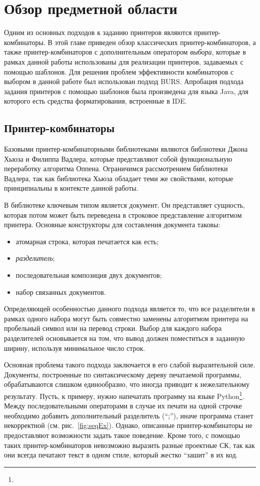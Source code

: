 \section{Обзор предметной области}

Одним из основных подходов к заданию принтеров являются принтер-комбинаторы.
В этой главе приведен обзор классических принтер-комбинаторов, а также
принтер-комбинаторов с дополнительным оператором \emph{выбора}, которые
в рамках данной работы использованы для реализации принтеров, задаваемых
с помощью шаблонов. Для решения проблем эффективности
комбинаторов с выбором в данной работе был использован подход BURS.
Апробация подхода задания принтеров с помощью шаблонов
была произведена для языка Java, для которого есть средства форматирования,
встроенные в IDE.

\subsection{Принтер-комбинаторы}

Базовыми принтер-комбинаторными библиотеками являются библиотеки
Джона Хьюза\cite{hughes} и Филиппа Вадлера\cite{wadler}, которые
представляют собой функциональную переработку алгоритма
Оппена\cite{oppen}.
Ограничимся рассмотрением библиотеки Вадлера, так как
библиотека Хьюза обладает теми же свойствами, которые принципиальны в контексте
данной работы.

В библиотеке ключевым типом является документ.
Он представляет сущность, которая потом может
быть переведена в строковое представление алгоритмом принтера.
Основные конструкторы для составления документа таковы:
\begin{itemize}
  \item атомарная строка, которая печатается как есть;
  \item \emph{разделитель};
  \item последовательная композиция двух документов;
  \item набор связанных документов.
\end{itemize}

Определяющей особенностью данного подхода является то, что все разделители
в рамках одного набора могут быть совместно заменены алгоритмом принтера
на пробельный символ или на перевод строки. Выбор для каждого набора разделителей
основывается на том, что вывод должен поместиться в заданную ширину,
используя минимальное число строк.

Основная проблема такого подхода заключается в его слабой выразительной силе.
Документы, построенные по синтаксическому дереву печатаемой программы,
обрабатываются слишком единообразно, что иногда приводит к нежелательному результату.
Пусть, к примеру, нужно напечатать программу на языке
Python\footnote{}.
Между последовательными операторами в случае их печати на одной строчке необходимо
добавить дополнительный разделитель (``;''), иначе программа станет некорректной
(см. рис.~\ref{fig:seqEx}). Однако, описанные принтер-комбинаторы не предоставляют
возможности задать такое поведение.
Кроме того, с помощью таких принтер-комбинаторов невозможно выразить разные проектные СК,
так как они всегда печатают текст в одном стиле, который жестко ``зашит'' в их код.

